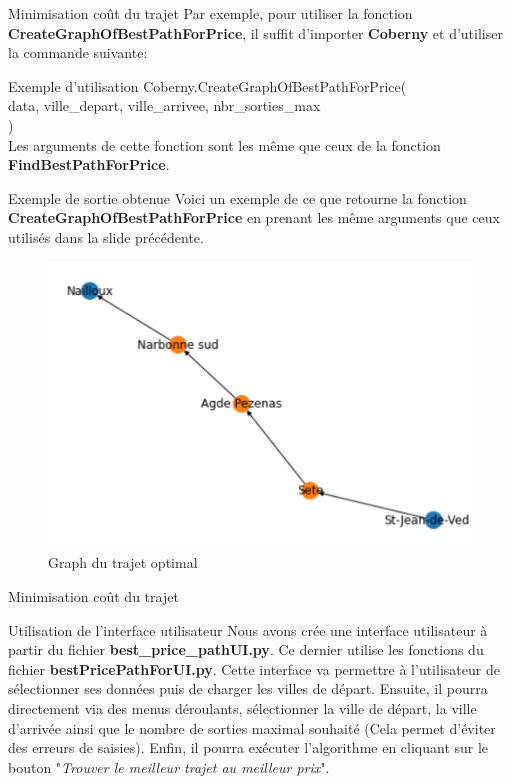 \documentclass{beamer}
\begin{document}
	\begin{frame}{Minimisation coût du trajet}
		\tiny
		Par exemple, pour utiliser la fonction \textbf{CreateGraphOfBestPathForPrice}, il suffit d'importer \textbf{Coberny} et d'utiliser la commande suivante:
		\begin{block}{\tiny Exemple d'utilisation}
			\tiny
			Coberny.CreateGraphOfBestPathForPrice( \\
			data, ville\_depart, ville\_arrivee, nbr\_sorties\_max \\
			) \\
			Les arguments de cette fonction sont les même que ceux de la fonction \textbf{FindBestPathForPrice}.
		\end{block}
	
		\begin{block}{\tiny Exemple de sortie obtenue}
			\tiny
			Voici un exemple de ce que retourne la fonction \textbf{CreateGraphOfBestPathForPrice} en prenant les même arguments que ceux utilisés dans la slide précédente.
				\begin{figure}
					\begin{center}
						\includegraphics[scale=0.24]{graph_exemple.png}
						\caption{\tiny Graph du trajet optimal}
					\end{center}
				\end{figure}
		\end{block}
	\end{frame}

	\begin{frame}{Minimisation coût du trajet}
		\begin{block}{Utilisation de l'interface utilisateur}
			Nous avons crée une interface utilisateur à  partir du fichier \textbf{best\_price\_pathUI.py}. Ce dernier utilise les fonctions du fichier \textbf{bestPricePathForUI.py}.
			Cette interface va permettre à  l'utilisateur de sélectionner ses données puis de charger les villes de départ. Ensuite, il pourra directement via des menus déroulants, sélectionner la ville de départ, la ville d'arrivée ainsi que le nombre de sorties maximal souhaité (Cela permet d'éviter des erreurs de saisies). Enfin, il pourra exécuter l'algorithme en cliquant sur le bouton "\textit{Trouver le meilleur trajet au meilleur prix}".
		\end{block}
	\end{frame}
\end{document}
